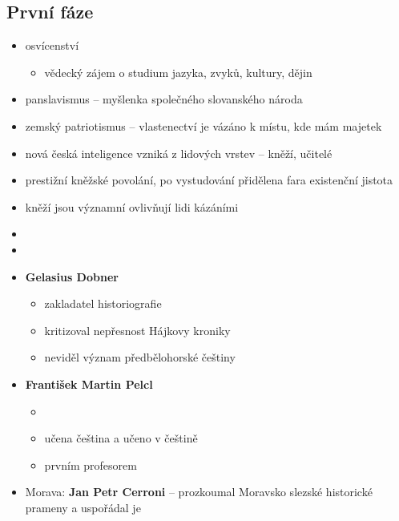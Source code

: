 \subsection{První fáze}
\begin{itemize}
\item osvícenství
	\begin{itemize}
	\item vědecký zájem o studium jazyka, zvyků, kultury, dějin
	\end{itemize}
\item panslavismus -- myšlenka společného slovanského národa
\item zemský patriotismus -- vlastenectví je vázáno k místu, kde mám majetek
\item nová česká inteligence vzniká z lidových vrstev -- kněží, učitelé
\item prestižní kněžské povolání, po vystudování přidělena fara \ra existenční jistota
\item kněží jsou významní \ra ovlivňují lidi kázáními 
\item {}
\item {}
\item \textbf{Gelasius Dobner}
	\begin{itemize}
	\item zakladatel historiografie
	\item kritizoval nepřesnost Hájkovy kroniky
	\item neviděl význam předbělohorské češtiny
	\end{itemize}
\item \textbf{František Martin Pelcl}
	\begin{itemize}
	\item {}
	\item[\ra] učena čeština a učeno v češtině
	\item prvním profesorem
	\end{itemize}
\item Morava: \textbf{Jan Petr Cerroni} -- prozkoumal Moravsko slezské historické prameny a uspořádal je
\end{itemize}

